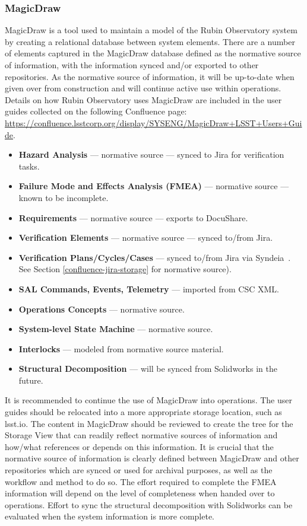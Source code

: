 \subsubsection{MagicDraw}

MagicDraw \citep{MagicDraw-cite} is a tool used to maintain a model of the Rubin Observatory system by creating a relational database between system elements.
There are a number of elements captured in the MagicDraw database defined as the normative source of information, with the information synced and/or exported to other repositories.
As the normative source of information, it will be up-to-date when given over from construction and will continue active use within operations.
Details on how Rubin Observatory uses MagicDraw are included in the user guides collected on the following Confluence page: \url{https://confluence.lsstcorp.org/display/SYSENG/MagicDraw+LSST+Users+Guide}.

\begin{itemize}
	\item \textbf{Hazard Analysis} --- normative source --- synced to Jira for verification tasks.
	\item \textbf{Failure Mode and Effects Analysis (FMEA)} --- normative source --- known to be incomplete.
	\item \textbf{Requirements} --- normative source --- exports to DocuShare.
	\item \textbf{Verification Elements} --- normative source --- synced to/from Jira.
	\item \textbf{Verification Plans/Cycles/Cases} --- synced to/from Jira via Syndeia\texttrademark\ \citep{syndeia-cite}.
	See Section \ref{confluence-jira-storage} for normative source).
	\item \textbf{SAL Commands, Events, Telemetry} --- imported from CSC XML.
	\item \textbf{Operations Concepts} --- normative source.
	\item \textbf{System-level State Machine} --- normative source.
	\item \textbf{Interlocks} --- modeled from normative source material.
	\item \textbf{Structural Decomposition} --- will be synced from Solidworks in the future.
\end{itemize}

It is recommended to continue the use of MagicDraw into operations.
The user guides should be relocated into a more appropriate storage location, such as lsst.io.
The content in MagicDraw should be reviewed to create the tree for the Storage View that can readily reflect normative sources of information and how/what references or depends on this information.
It is crucial that the normative source of information is clearly defined between MagicDraw and other repositories which are synced or used for archival purposes, as well as the workflow and method to do so.
The effort required to complete the FMEA information will depend on the level of completeness when handed over to operations.
Effort to sync the structural decomposition with Solidworks can be evaluated when the system information is more complete.

